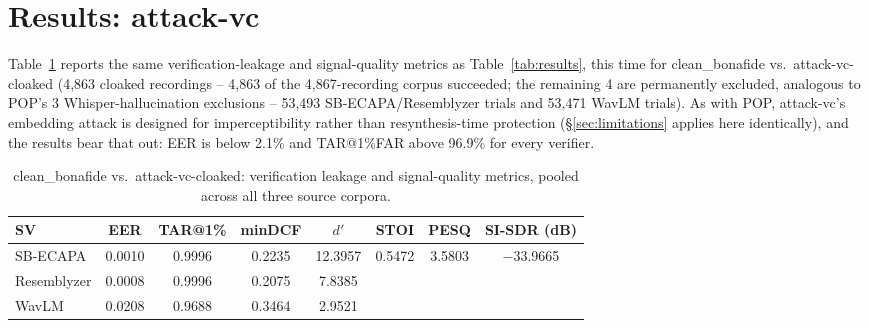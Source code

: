 \documentclass[11pt]{article}
\begin{document}
\section{Results: attack-vc}
\label{sec:results-attackvc}

Table~\ref{tab:results-attackvc} reports the same verification-leakage
and signal-quality metrics as Table~\ref{tab:results}, this time for
clean\_bonafide vs.\ attack-vc-cloaked (4,863 cloaked recordings --
4,863 of the 4,867-recording corpus succeeded; the remaining 4 are
permanently excluded, analogous to POP's 3 Whisper-hallucination
exclusions -- 53,493 SB-ECAPA/Resemblyzer trials and 53,471 WavLM
trials). As with POP, attack-vc's embedding attack is designed for
imperceptibility rather than resynthesis-time protection
(\S\ref{sec:limitations} applies here identically), and the results
bear that out: EER is below 2.1\% and TAR@1\%FAR above 96.9\% for
every verifier.

\begin{table}[H]
\centering
\caption{clean\_bonafide vs.\ attack-vc-cloaked: verification leakage
and signal-quality metrics, pooled across all three source corpora.}
\label{tab:results-attackvc}
\begin{tabular}{lccccccc}
\toprule
SV & EER & TAR@1\% & minDCF & $d'$ & STOI & PESQ & SI-SDR (dB) \\
\midrule
SB-ECAPA     & 0.0010 & 0.9996 & 0.2235 & 12.3957 & \multirow{3}{*}{0.5472} & \multirow{3}{*}{3.5803} & \multirow{3}{*}{$-$33.9665} \\
Resemblyzer  & 0.0008 & 0.9996 & 0.2075 & 7.8385  & & & \\
WavLM        & 0.0208 & 0.9688 & 0.3464 & 2.9521  & & & \\
\bottomrule
\end{tabular}
\end{table}
\end{document}
